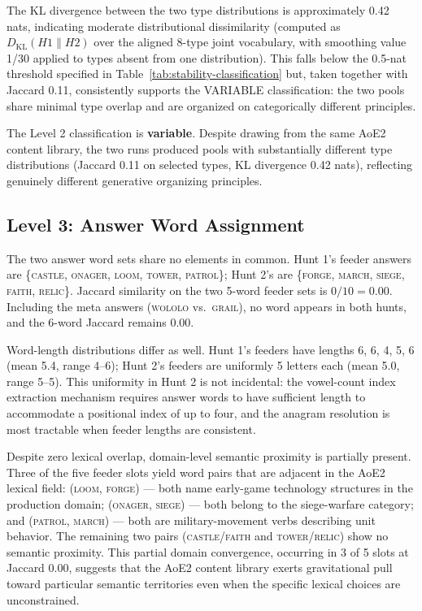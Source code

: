 The KL divergence between the two type distributions is approximately 0.42 nats, indicating moderate distributional dissimilarity (computed as $D_{\mathrm{KL}}(H1 \| H2)$ over the aligned 8-type joint vocabulary, with smoothing value 1/30 applied to types absent from one distribution). This falls below the 0.5-nat threshold specified in Table~\ref{tab:stability-classification} but, taken together with Jaccard 0.11, consistently supports the VARIABLE classification: the two pools share minimal type overlap and are organized on categorically different principles.

The Level 2 classification is \textbf{variable}. Despite drawing from the same AoE2 content library, the two runs produced pools with substantially different type distributions (Jaccard 0.11 on selected types, KL divergence 0.42 nats), reflecting genuinely different generative organizing principles.

\subsection{Level 3: Answer Word Assignment}
\label{sec:results-assignment}

The two answer word sets share no elements in common. Hunt 1's feeder answers are \{\textsc{castle}, \textsc{onager}, \textsc{loom}, \textsc{tower}, \textsc{patrol}\}; Hunt 2's are \{\textsc{forge}, \textsc{march}, \textsc{siege}, \textsc{faith}, \textsc{relic}\}. Jaccard similarity on the two 5-word feeder sets is $0/10 = 0.00$. Including the meta answers (\textsc{wololo} vs.\ \textsc{grail}), no word appears in both hunts, and the 6-word Jaccard remains $0.00$.

Word-length distributions differ as well. Hunt 1's feeders have lengths 6, 6, 4, 5, 6 (mean 5.4, range 4--6); Hunt 2's feeders are uniformly 5 letters each (mean 5.0, range 5--5). This uniformity in Hunt 2 is not incidental: the vowel-count index extraction mechanism requires answer words to have sufficient length to accommodate a positional index of up to four, and the anagram resolution is most tractable when feeder lengths are consistent.

Despite zero lexical overlap, domain-level semantic proximity is partially present. Three of the five feeder slots yield word pairs that are adjacent in the AoE2 lexical field: (\textsc{loom}, \textsc{forge}) --- both name early-game technology structures in the production domain; (\textsc{onager}, \textsc{siege}) --- both belong to the siege-warfare category; and (\textsc{patrol}, \textsc{march}) --- both are military-movement verbs describing unit behavior. The remaining two pairs (\textsc{castle}/\textsc{faith} and \textsc{tower}/\textsc{relic}) show no semantic proximity. This partial domain convergence, occurring in 3 of 5 slots at Jaccard 0.00, suggests that the AoE2 content library exerts gravitational pull toward particular semantic territories even when the specific lexical choices are unconstrained.


